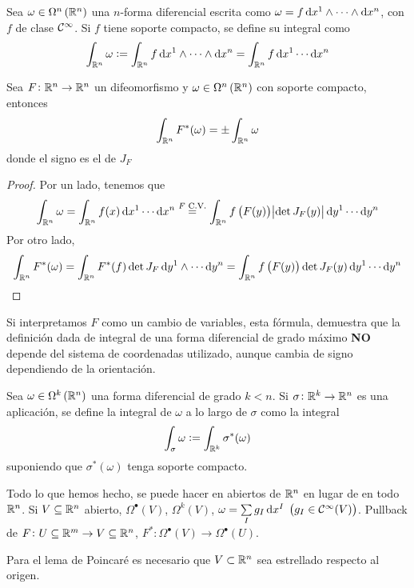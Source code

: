 \begin{defi}
    Sea $\omega \in \Omega^n\left( \mathbb{R}^n \right)$ una $n$-forma diferencial escrita como $\omega = f \dif x^1 \wedge \cdots \wedge \dif x^n$,
    con $f$ de clase $\mathcal{C}^\infty$. Si $f$ tiene soporte compacto, se define su integral como
    \[
        \int_{\real^n} \omega := \int_{\real^n} f\dif x^1 \wedge \cdots \wedge \dif x^n = \int_{\real^n} f \dif x^1 \cdots \dif x^n
    \]
\end{defi}

\begin{prop}
    Sea $F \colon \mathbb{R}^n \to \mathbb{R}^n$ un difeomorfismo y $\omega \in \Omega^n\left( \mathbb{R}^n \right)$ con soporte compacto, entonces
    \[
        \int_{\mathbb{R}^n} F^\ast(\omega) = \pm \int_{\mathbb{R}^n} \omega
    \]
    donde el signo es el de $J_F$
\end{prop}

\begin{proof}
    Por un lado, tenemos que
    \[
        \int_{\real^n} \omega = \int_{\real^n} f(x) \dif x^1 \cdots \dif x^n \stackrel{F \text{ C.V.}}{=} \int_{\real^n}
        f\left( F(y) \right) \abs{\det J_F(y)} \dif y^1 \cdots \dif y^n
    \]
    Por otro lado,
    \[
        \int_{\real^n} F^\ast(\omega) = \int_{\real^n} F^\ast (f) \det J_F \dif y^1 \wedge \cdots \dif y^n =
        \int_{\real^n} f\left( F(y) \right) \det J_F(y) \dif y^1 \cdots \dif y^n
    \]
\end{proof}

\begin{obs}
    Si interpretamos $F$ como un cambio de variables, esta fórmula, demuestra que la definición dada de integral de una forma diferencial
    de grado máximo \textbf{NO} depende del sistema de coordenadas utilizado, aunque cambia de signo dependiendo de la orientación.
\end{obs}

\begin{defi}
    Sea $\omega \in \Omega^k\left( \mathbb{R}^n \right)$ una forma diferencial de grado $k < n$. Si $\sigma \colon \mathbb{R}^k \to \mathbb{R}^n$ es
    una aplicación, se define la integral de $\omega$ a lo largo de $\sigma$ como la integral
    \[
        \int_{\sigma} \omega := \int_{\mathbb{R}^k} \sigma^\ast(\omega)
    \]
    suponiendo que $\sigma^\ast(\omega)$ tenga soporte compacto.
\end{defi}

\begin{obs}
    Todo lo que hemos hecho, se puede hacer en abiertos de $\mathbb{R}^n$ en lugar de en todo $\mathbb{R}^n$. Si $V \subseteq \mathbb{R}^n$ abierto,
    $\Omega^\bullet(V)$, $\Omega^k(V)$, $\omega = \sum\limits_I g_I \dif x^I$ $\left( g_I \in \mathcal{C}^\infty(V) \right)$.
    Pullback de $F \colon U \subseteq \mathbb{R}^m \to V \subseteq \mathbb{R}^n$, $F^\ast \colon \Omega^\bullet (V) \to \Omega^\bullet (U)$.

    Para el lema de Poincar\'e es necesario que $V \subset \mathbb{R}^n$ sea estrellado respecto al origen.
\end{obs}


